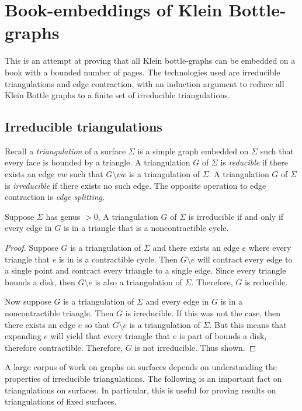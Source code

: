 \section{Book-embeddings of Klein Bottle-graphs}
This is an attempt at proving that all Klein bottle-graphs can be embedded on a book with a bounded number of pages. The technologies used are irreducible triangulations and edge contraction, with an induction argument to reduce all Klein Bottle graphs to a finite set of irreducible triangulations.

\subsection{Irreducible triangulations}
Recall a \textit{triangulation} of a surface $\Sigma$ is a simple graph embedded on $\Sigma$ such that every face is bounded by a triangle. A triangulation $G$ of $\Sigma$ is \textit{reducible} if there exists an edge $vw$ such that $G \setminus vw$ is a triangulation of $\Sigma$. A triangulation $G$ of $\Sigma$ is \textit{irreducible} if there exists no such edge. The opposite operation to edge contraction is \textit{edge splitting}. 

\begin{proposition}
    Suppose $\Sigma$ has genus $> 0$, A triangulation $G$ of $\Sigma$ is irreducible if and only if every edge in $G$ is in a triangle that is a noncontractible cycle.
\end{proposition}

\begin{proof}
    Suppose $G$ is a triangulation of $\Sigma$ and there exists an edge $e$ where every triangle that $e$ is in is a contractible cycle. Then $G \setminus e$ will contract every edge to a single point and contract every triangle to a single edge. Since every triangle bounds a disk, then $G \setminus e$ is also a triangulation of $\Sigma$. Therefore, $G$ is reducible. 

    Now suppose $G$ is a triangulation of $\Sigma$ and every edge in $G$ is in a noncontractible triangle. Then $G$ is irreducible. If this was not the case, then there exists an edge $e$ so that $G \setminus e$ is a triangulation of $\Sigma$. But this means that expanding $e$ will yield that every triangle that $e$ is part of bounds a disk, therefore contractible. Therefore, $G$ is not irreducible. Thus shown. 
\end{proof}

A large corpus of work on graphs on surfaces depends on understanding the properties of irreducible triangulations. The following is an important fact on triangulations on surfaces. In particular, this is useful for proving results on triangulations of fixed surfaces. 

